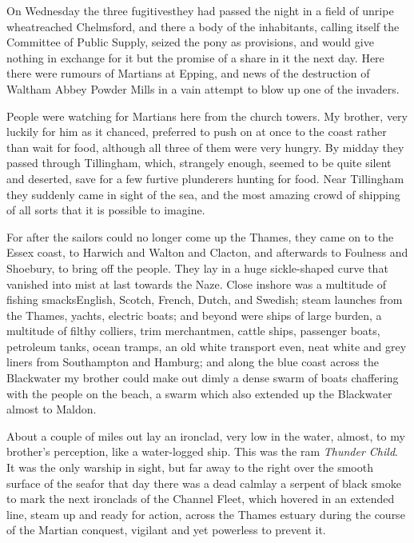 On Wednesday the three fugitives\dash{}they had passed the night in a
field of unripe wheat\dash{}reached Chelmsford, and there a body of the
inhabitants, calling itself the Committee of Public Supply, seized
the pony as provisions, and would give nothing in exchange for it
but the promise of a share in it the next day. Here there were
rumours of Martians at Epping, and news of the destruction of
Waltham Abbey Powder Mills in a vain attempt to blow up one of the
invaders.

People were watching for Martians here from the church towers. My
brother, very luckily for him as it chanced, preferred to push on
at once to the coast rather than wait for food, although all three
of them were very hungry. By midday they passed through Tillingham,
which, strangely enough, seemed to be quite silent and deserted,
save for a few furtive plunderers hunting for food. Near Tillingham
they suddenly came in sight of the sea, and the most amazing crowd
of shipping of all sorts that it is possible to imagine.

For after the sailors could no longer come up the Thames, they came
on to the Essex coast, to Harwich and Walton and Clacton, and
afterwards to Foulness and Shoebury, to bring off the people. They
lay in a huge sickle-shaped curve that vanished into mist at last
towards the Naze. Close inshore was a multitude of fishing
smacks\dash{}English, Scotch, French, Dutch, and Swedish; steam launches
from the Thames, yachts, electric boats; and beyond were ships of
large burden, a multitude of filthy colliers, trim merchantmen,
cattle ships, passenger boats, petroleum tanks, ocean tramps, an
old white transport even, neat white and grey liners from
Southampton and Hamburg; and along the blue coast across the
Blackwater my brother could make out dimly a dense swarm of boats
chaffering with the people on the beach, a swarm which also
extended up the Blackwater almost to Maldon.

About a couple of miles out lay an ironclad, very low in the water,
almost, to my brother's perception, like a water-logged ship. This
was the ram \emph{Thunder Child}. It was the only warship in sight,
but far away to the right over the smooth surface of the sea\dash{}for
that day there was a dead calm\dash{}lay a serpent of black smoke to
mark the next ironclads of the Channel Fleet, which hovered in an
extended line, steam up and ready for action, across the Thames
estuary during the course of the Martian conquest, vigilant and yet
powerless to prevent it.

